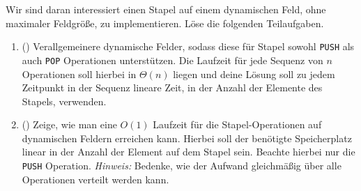 \documentclass{uebung_cs}
\begin{document}
\begin{aufgabe}
	Wir sind daran interessiert einen Stapel auf einem dynamischen Feld, ohne maximaler Feldgröße, zu implementieren.
	Löse die folgenden Teilaufgaben.
	\begin{enumerate}
		\item (\hard) Verallgemeinere dynamische Felder, sodass diese für Stapel sowohl \texttt{PUSH} als auch \texttt{POP} Operationen unterstützen.
		Die Laufzeit für jede Sequenz von $n$ Operationen soll hierbei in $\Theta(n)$ liegen und deine Lösung soll zu jedem Zeitpunkt in der Sequenz lineare Zeit, in der Anzahl der Elemente des Stapels, verwenden.
		
		\item (\veryhard) Zeige, wie man eine $O(1)$ Laufzeit für die Stapel-Operationen auf dynamischen Feldern erreichen kann.
		Hierbei soll der benötigte Speicherplatz linear in der Anzahl der Element auf dem Stapel sein.
		Beachte hierbei nur die \texttt{PUSH} Operation.
		\textit{Hinweis:} Bedenke, wie der Aufwand gleichmäßig über alle Operationen verteilt werden kann.
	\end{enumerate}
\end{aufgabe}
\end{document}
